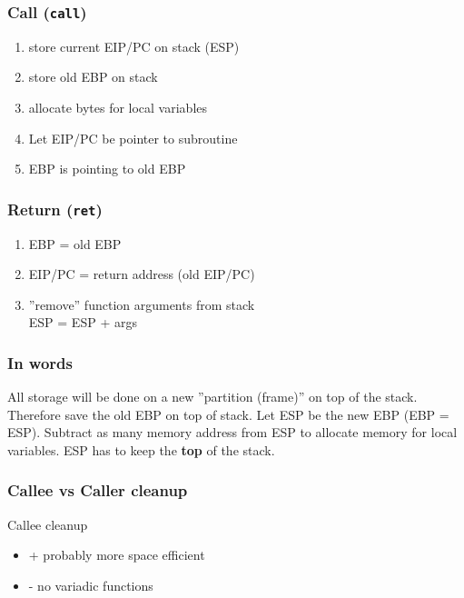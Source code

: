 \documentclass[a4paper,twocolumn]{article}
\begin{document}
\subsubsection{Call (\texttt{call})}

\begin{enumerate}
  \item store current EIP/PC on stack (ESP)
  \item store old EBP on stack
  \item allocate bytes for local variables
  \item Let EIP/PC be pointer to subroutine
  \item EBP is pointing to old EBP
\end{enumerate}

\subsubsection{Return (\texttt{ret})}

\begin{enumerate}
  \item EBP = old EBP
  \item EIP/PC = return address (old EIP/PC)
  \item ''remove'' function arguments from stack \\
        ESP = ESP + args
\end{enumerate}

\subsubsection{In words}

All storage will be done on a new ''partition (frame)'' on top of the stack.
Therefore save the old EBP on top of stack. Let ESP be the new EBP (EBP =
ESP). Subtract as many memory address from ESP to allocate memory for local
variables. ESP has to keep the \textbf{top} of the stack.

\subsubsection{Callee vs Caller cleanup}

Callee cleanup

\begin{itemize}
  \item + probably more space efficient
  \item - no variadic functions
\end{itemize}
\end{document}

